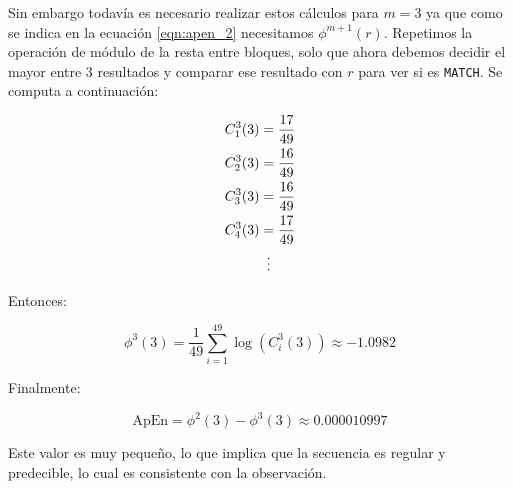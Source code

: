 \documentclass[a4paper,12pt]{article}
\begin{document}
Sin embargo todavía es necesario realizar estos cálculos para $m=3$ ya que como se indica en la ecuación \ref{eqn:apen_2} necesitamos $\phi^{m+1}(r)$. Repetimos la operación de módulo de la resta entre bloques, solo que ahora debemos decidir el mayor entre 3 resultados y comparar ese resultado con $r$ para ver si es \texttt{MATCH}. Se computa a continuación:

\begin{align*}
   C_1^3(3)&=\frac{17}{49} 	\\
   C_2^3(3)&=\frac{16}{49} 	\\
   C_3^3(3)&=\frac{16}{49} 	\\
   C_4^3(3)&=\frac{17}{49} 	\\
   & \vdotswithin{=} 		\\
\end{align*}

Entonces:

$$\phi^3(3)=\frac{1}{49} \sum_{i=1}^{49} \log(C_i^3(3)) \approx -1.0982$$

Finalmente:

$$\textrm{ApEn}=\phi^2(3) - \phi^3(3) \approx 0.000010997$$

Este valor es muy pequeño, lo que implica que la secuencia es regular y predecible, lo cual es consistente con la observación.
\end{document}
